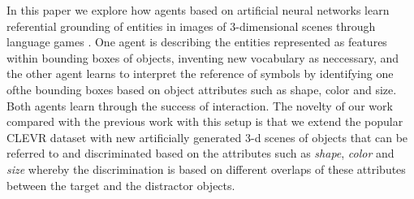 \documentclass[11pt]{article}
\begin{document}

In this paper we explore how agents based on artificial neural networks learn referential grounding of entities in images of 3-dimensional scenes through language games \citep{Clark:1996aa,Bartlett:2005aa,Kirby:2008ab,SteelsLoetzsch:2009,Zaslavsky:2018aa}.
One agent is describing the entities represented as features within bounding boxes of objects, inventing new vocabulary as neccessary, and the other agent learns to interpret the reference of symbols by identifying %
one ofthe bounding boxes based on object attributes such as shape, color and size.
Both agents learn through the success of interaction.
The novelty of our work compared with the previous work with this setup \citep{Kharitonov2019,Lazaridou2016} is that we extend the popular CLEVR dataset \citep{Johnson2016} with new artificially generated 3-d scenes of objects that can be referred to and discriminated based on the attributes such as \emph{shape}, \emph{color} and \emph{size} whereby the discrimination is based on different overlaps of these attributes between the target and the distractor objects. %
\end{document}
